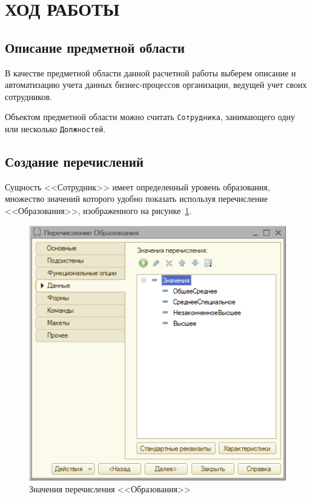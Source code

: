 \section[Ход работы]{ХОД РАБОТЫ}

\subsection{Описание предметной области}

В качестве предметной области данной расчетной работы выберем
описание и автоматизацию учета данных бизнес-процессов организации,
ведущей учет своих сотрудников.

Объектом предметной области можно считать \texttt{Сотрудника}, занимающего
одну или несколько \texttt{Должностей}.


\subsection{Создание перечислений}

Сущность <<Сотрудник>> имеет определенный уровень образования, множество значений
которого удобно показать используя перечисление <<Образования>>, изображенного
на рисунке~\ref{fig:enum}.
\begin{figure}[h!]
  \centering
  \includegraphics[width=120mm]{pic/enum}
  \caption{Значения перечисления <<Образования>>}
  \label{fig:enum}
\end{figure}

